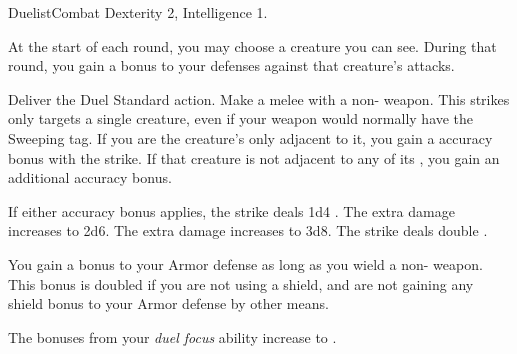   \begin{feat}{Duelist}{Combat}
    \featpre Dexterity 2, Intelligence 1.

     At the start of each round, you may choose a creature you can see.
    During that round, you gain a  bonus to your defenses against that creature's attacks.

    \begin{activeability}{Deliver the Duel}
      \abilityusagetime Standard action.
      \rankline
      Make a melee  with a non- weapon.
      This strikes only targets a single creature, even if your weapon would normally have the Sweeping tag.
      If you are the creature's only  adjacent to it, you gain a  accuracy bonus with the strike.
      If that creature is not adjacent to any of its , you gain an additional  accuracy bonus.

      \rankline
       If either accuracy bonus applies, the strike deals 1d4 .
       The extra damage increases to 2d6.
       The extra damage increases to 3d8.
       The strike deals double .
    \end{activeability}

     You gain a  bonus to your Armor defense as long as you wield a non- weapon.
    This bonus is doubled if you are not using a shield, and are not gaining any shield bonus to your Armor defense by other means.

     The bonuses from your \textit{duel focus} ability increase to .
  \end{feat}

